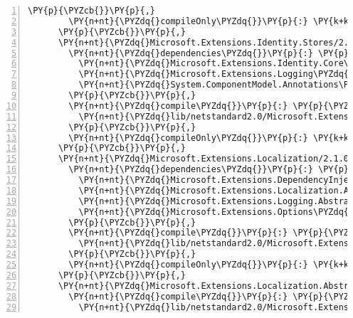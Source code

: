 \begin{Verbatim}[commandchars=\\\{\},numbers=left,firstnumber=1,stepnumber=1,numberblanklines=0]
        \PY{p}{\PYZcb{}}\PY{p}{,}
        \PY{n+nt}{\PYZdq{}compileOnly\PYZdq{}}\PY{p}{:} \PY{k+kc}{true}
      \PY{p}{\PYZcb{}}\PY{p}{,}
      \PY{n+nt}{\PYZdq{}Microsoft.Extensions.Identity.Stores/2.1.0\PYZhy{}rc1\PYZhy{}final\PYZdq{}}\PY{p}{:} \PY{p}{\PYZob{}}
        \PY{n+nt}{\PYZdq{}dependencies\PYZdq{}}\PY{p}{:} \PY{p}{\PYZob{}}
          \PY{n+nt}{\PYZdq{}Microsoft.Extensions.Identity.Core\PYZdq{}}\PY{p}{:} \PY{l+s+s2}{\PYZdq{}2.1.0\PYZhy{}rc1\PYZhy{}final\PYZdq{}}\PY{p}{,}
          \PY{n+nt}{\PYZdq{}Microsoft.Extensions.Logging\PYZdq{}}\PY{p}{:} \PY{l+s+s2}{\PYZdq{}2.1.0\PYZhy{}rc1\PYZhy{}final\PYZdq{}}\PY{p}{,}
          \PY{n+nt}{\PYZdq{}System.ComponentModel.Annotations\PYZdq{}}\PY{p}{:} \PY{l+s+s2}{\PYZdq{}4.5.0\PYZhy{}rc1\PYZdq{}}
        \PY{p}{\PYZcb{}}\PY{p}{,}
        \PY{n+nt}{\PYZdq{}compile\PYZdq{}}\PY{p}{:} \PY{p}{\PYZob{}}
          \PY{n+nt}{\PYZdq{}lib/netstandard2.0/Microsoft.Extensions.Identity.Stores.dll\PYZdq{}}\PY{p}{:} \PY{p}{\PYZob{}}\PY{p}{\PYZcb{}}
        \PY{p}{\PYZcb{}}\PY{p}{,}
        \PY{n+nt}{\PYZdq{}compileOnly\PYZdq{}}\PY{p}{:} \PY{k+kc}{true}
      \PY{p}{\PYZcb{}}\PY{p}{,}
      \PY{n+nt}{\PYZdq{}Microsoft.Extensions.Localization/2.1.0\PYZhy{}rc1\PYZhy{}final\PYZdq{}}\PY{p}{:} \PY{p}{\PYZob{}}
        \PY{n+nt}{\PYZdq{}dependencies\PYZdq{}}\PY{p}{:} \PY{p}{\PYZob{}}
          \PY{n+nt}{\PYZdq{}Microsoft.Extensions.DependencyInjection.Abstractions\PYZdq{}}\PY{p}{:} \PY{l+s+s2}{\PYZdq{}2.1.0\PYZhy{}rc1\PYZhy{}final\PYZdq{}}\PY{p}{,}
          \PY{n+nt}{\PYZdq{}Microsoft.Extensions.Localization.Abstractions\PYZdq{}}\PY{p}{:} \PY{l+s+s2}{\PYZdq{}2.1.0\PYZhy{}rc1\PYZhy{}final\PYZdq{}}\PY{p}{,}
          \PY{n+nt}{\PYZdq{}Microsoft.Extensions.Logging.Abstractions\PYZdq{}}\PY{p}{:} \PY{l+s+s2}{\PYZdq{}2.1.0\PYZhy{}rc1\PYZhy{}final\PYZdq{}}\PY{p}{,}
          \PY{n+nt}{\PYZdq{}Microsoft.Extensions.Options\PYZdq{}}\PY{p}{:} \PY{l+s+s2}{\PYZdq{}2.1.0\PYZhy{}rc1\PYZhy{}final\PYZdq{}}
        \PY{p}{\PYZcb{}}\PY{p}{,}
        \PY{n+nt}{\PYZdq{}compile\PYZdq{}}\PY{p}{:} \PY{p}{\PYZob{}}
          \PY{n+nt}{\PYZdq{}lib/netstandard2.0/Microsoft.Extensions.Localization.dll\PYZdq{}}\PY{p}{:} \PY{p}{\PYZob{}}\PY{p}{\PYZcb{}}
        \PY{p}{\PYZcb{}}\PY{p}{,}
        \PY{n+nt}{\PYZdq{}compileOnly\PYZdq{}}\PY{p}{:} \PY{k+kc}{true}
      \PY{p}{\PYZcb{}}\PY{p}{,}
      \PY{n+nt}{\PYZdq{}Microsoft.Extensions.Localization.Abstractions/2.1.0\PYZhy{}rc1\PYZhy{}final\PYZdq{}}\PY{p}{:} \PY{p}{\PYZob{}}
        \PY{n+nt}{\PYZdq{}compile\PYZdq{}}\PY{p}{:} \PY{p}{\PYZob{}}
          \PY{n+nt}{\PYZdq{}lib/netstandard2.0/Microsoft.Extensions.Localization.Abstractions.dll\PYZdq{}}\PY{p}{:} \PY{p}{\PYZob{}}\PY{p}{\PYZcb{}}

\end{Verbatim}
